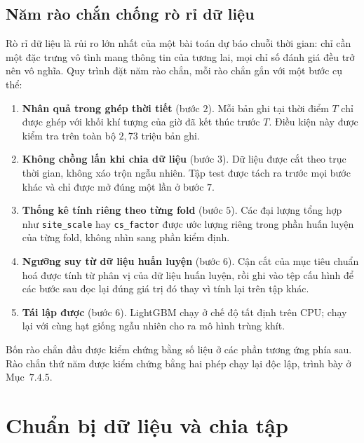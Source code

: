 \FloatBarrier
\subsection{Năm rào chắn chống rò rỉ dữ liệu}

Rò rỉ dữ liệu là rủi ro lớn nhất của một bài toán dự báo chuỗi thời gian: chỉ cần một
đặc trưng vô tình mang thông tin của tương lai, mọi chỉ số đánh giá đều trở nên vô
nghĩa. Quy trình đặt năm rào chắn, mỗi rào chắn gắn với một bước cụ thể:

\begin{enumerate}
    \item \textbf{Nhân quả trong ghép thời tiết} (bước $2$). Mỗi bản ghi tại thời điểm
    $T$ chỉ được ghép với khối khí tượng của giờ đã kết thúc trước $T$. Điều kiện này
    được kiểm tra trên toàn bộ $2{,}73$ triệu bản ghi.

    \item \textbf{Không chồng lấn khi chia dữ liệu} (bước $3$). Dữ liệu được cắt theo
    trục thời gian, không xáo trộn ngẫu nhiên. Tập test được tách ra trước mọi bước
    khác và chỉ được mở đúng một lần ở bước $7$.

    \item \textbf{Thống kê tính riêng theo từng fold} (bước $5$). Các đại lượng tổng
    hợp như \texttt{site\_scale} hay \texttt{cs\_factor} được ước lượng riêng trong
    phần huấn luyện của từng fold, không nhìn sang phần kiểm định.

    \item \textbf{Ngưỡng suy từ dữ liệu huấn luyện} (bước $6$). Cận cắt của mục tiêu
    chuẩn hoá được tính từ phân vị của dữ liệu huấn luyện, rồi ghi vào tệp cấu hình để
    các bước sau đọc lại đúng giá trị đó thay vì tính lại trên tập khác.

    \item \textbf{Tái lập được} (bước $6$). LightGBM chạy ở chế độ tất định trên CPU;
    chạy lại với cùng hạt giống ngẫu nhiên cho ra mô hình trùng khít.
\end{enumerate}

Bốn rào chắn đầu được kiểm chứng bằng số liệu ở các phần tương ứng phía sau. Rào chắn
thứ năm được kiểm chứng bằng hai phép chạy lại độc lập, trình bày ở Mục~$7.4.5$.

\FloatBarrier
\section{Chuẩn bị dữ liệu và chia tập}

